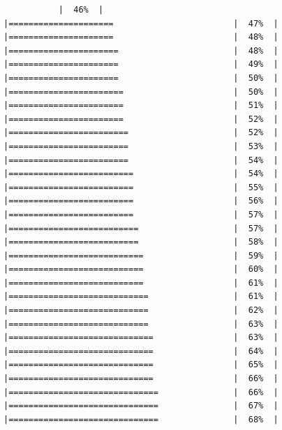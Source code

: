 \documentclass[
  krantz2]{krantz}
\begin{document}
\begin{verbatim}
           |  46%  |                                                     |=====================                        |  47%  |                                                     |=====================                        |  48%  |                                                     |======================                       |  48%  |                                                     |======================                       |  49%  |                                                     |======================                       |  50%  |                                                     |=======================                      |  50%  |                                                     |=======================                      |  51%  |                                                     |=======================                      |  52%  |                                                     |========================                     |  52%  |                                                     |========================                     |  53%  |                                                     |========================                     |  54%  |                                                     |=========================                    |  54%  |                                                     |=========================                    |  55%  |                                                     |=========================                    |  56%  |                                                     |=========================                    |  57%  |                                                     |==========================                   |  57%  |                                                     |==========================                   |  58%  |                                                     |===========================                  |  59%  |                                                     |===========================                  |  60%  |                                                     |===========================                  |  61%  |                                                     |============================                 |  61%  |                                                     |============================                 |  62%  |                                                     |============================                 |  63%  |                                                     |=============================                |  63%  |                                                     |=============================                |  64%  |                                                     |=============================                |  65%  |                                                     |=============================                |  66%  |                                                     |==============================               |  66%  |                                                     |==============================               |  67%  |                                                     |==============================               |  68%  |                                                     
\end{verbatim}
\end{document}
